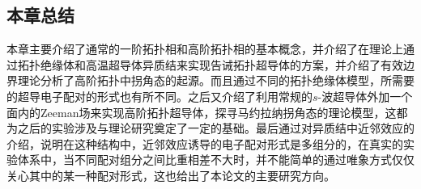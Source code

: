 \subsection{本章总结}
 本章主要介绍了通常的一阶拓扑相和高阶拓扑相的基本概念，并介绍了在理论上通过拓扑绝缘体和高温超导体异质结来实现告诫拓扑超导体的方案，并介绍了有效边界理论分析了高阶拓扑中拐角态的起源。而且通过不同的拓扑绝缘体模型，所需要的超导电子配对的形式也有所不同。之后又介绍了利用常规的$s$-波超导体外加一个面内的Zeeman场来实现高阶拓扑超导体，探寻马约拉纳拐角态的理论模型，这都为之后的实验涉及与理论研究奠定了一定的基础。最后通过对异质结中近邻效应的介绍，说明在这种结构中，近邻效应诱导的电子配对形式是多组分的，在真实的实验体系中，当不同配对组分之间比重相差不大时，并不能简单的通过唯象方式仅仅关心其中的某一种配对形式，这也给出了本论文的主要研究方向。










